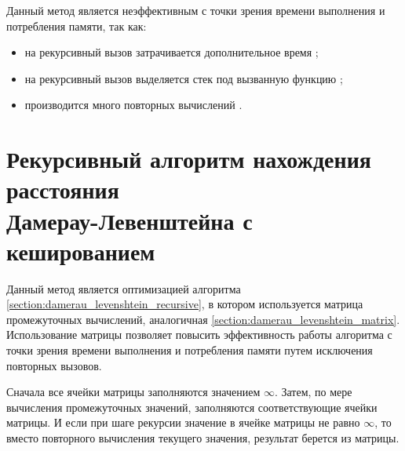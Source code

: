Данный метод является неэффективным с точки зрения времени выполнения и потребления памяти, так как:

\begin{itemize}
	\item на рекурсивный вызов затрачивается дополнительное время \cite{bib:2};
	\item на рекурсивный вызов выделяется стек под вызванную функцию \cite{bib:2};
	\item производится много повторных вычислений \cite{bib:1}.
\end{itemize}

\section{Рекурсивный алгоритм нахождения расстояния \\ Дамерау-Левенштейна с кешированием}

Данный метод является оптимизацией алгоритма \ref{section:damerau_levenshtein_recursive}, в котором используется матрица промежуточных вычислений, аналогичная \ref{section:damerau_levenshtein_matrix}. Использование матрицы позволяет повысить эффективность работы алгоритма с точки зрения времени выполнения и потребления памяти путем исключения повторных вызовов.

Сначала все ячейки матрицы заполняются значением $\infty$. Затем, по мере вычисления промежуточных значений, заполняются соответствующие ячейки матрицы. И если при шаге рекурсии значение в ячейке матрицы не равно $\infty$, то вместо повторного вычисления текущего значения, результат берется из матрицы.


\newpage